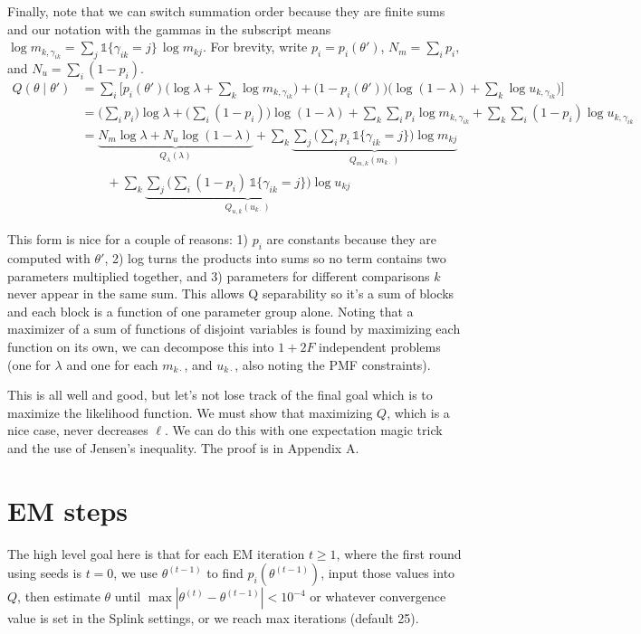 \documentclass[11pt]{article}
\begin{document}
Finally, note that we can switch summation order because they are finite sums and our notation with the gammas in the subscript means $\log m_{k,\gamma_{ik}} = \sum_{j} \mathds{1}\{\gamma_{ik}=j\} \, \log m_{kj}$. For brevity, write $p_i = p_i(\theta')$, $N_m = \sum_i p_i$, and $N_u = \sum_i (1 - p_i)$.
\[
\begin{aligned}
Q(\theta \mid \theta')
&= \sum_{i} \Big[ p_i(\theta') \Big( \log \lambda + \sum_{k} \log m_{k,\gamma_{ik}} \Big)
   + \big(1 - p_i(\theta')\big) \Big( \log(1-\lambda) + \sum_{k} \log u_{k,\gamma_{ik}} \Big) \Big] \\
&= \Big(\sum_i p_i\Big) \log \lambda
+ \Big(\sum_i (1-p_i)\Big) \log(1-\lambda)
+ \sum_{k} \sum_{i} p_i \log m_{k,\gamma_{ik}}
+ \sum_{k} \sum_{i} (1-p_i) \log u_{k,\gamma_{ik}} \\
&= \underbrace{N_m \log \lambda + N_u \log(1-\lambda)}_{Q_\lambda(\lambda)}
+ \sum_{k} \underbrace{\sum_{j} \Big( \sum_{i} p_i \, \mathds{1}\{\gamma_{ik}=j\} \Big) \log m_{kj}}_{Q_{m,k}(m_{k\cdot})} \\
&\qquad + \sum_{k} \underbrace{\sum_{j} \Big( \sum_{i} (1-p_i) \, \mathds{1}\{\gamma_{ik}=j\} \Big) \log u_{kj}}_{Q_{u,k}(u_{k\cdot})}
\end{aligned}
\]

This form is nice for a couple of reasons: 1) $p_i$ are constants because they are computed with $\theta'$, 2) log turns the products into sums so no term contains two parameters multiplied together, and 3) parameters for different comparisons $k$ never appear in the same sum. This allows Q separability so it's a sum of blocks and each block is a function of one parameter group alone. Noting that a maximizer of a sum of functions of disjoint variables is found by maximizing each function on its own, we can decompose this into $1+2F$ independent problems (one for $\lambda$ and one for each $m_{k\cdot}$, and $u_{k\cdot}$, also noting the PMF constraints).

This is all well and good, but let's not lose track of the final goal which is to maximize the likelihood function. We must show that maximizing $Q$, which is a nice case, never decreases $\ell$. We can do this with one expectation magic trick and the use of Jensen's inequality. The proof is in Appendix A.

\section{EM steps}

The high level goal here is that for each EM iteration $t\geq 1$, where the first round using seeds is $t=0$, we use $\theta^{(t-1)}$ to find $p_i(\theta^{(t-1)})$, input those values into $Q$, then estimate $\theta$ until $\max|\theta^{(t)} - \theta^{(t-1)}| < 10^{-4}$ or whatever convergence value is set in the Splink settings, or we reach max iterations (default 25).
\end{document}
